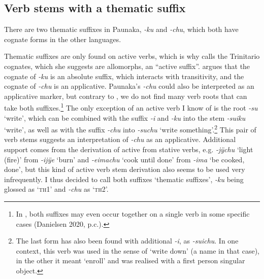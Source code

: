 
%

\subsection{Verb stems with a thematic suffix}\label{sec:ActiveVerbs_TH}

There are two thematic suffixes in Paunaka, \textit{-ku} and \textit{-chu}, which both have cognate forms in the other  languages. 

Thematic suffixes are only found on active verbs, which is why \citet[380]{Rose2014b} calls the Trinitario cognates, which she suggests are allomorphs, an “active suffix”. \citet[240--244]{Danielsen2007} argues that the  cognate of \textit{-ku} is an absolute suffix, which interacts with transitivity, and the cognate of \textit{-chu} is an applicative. Paunaka’s \textit{-chu} could also be interpreted as an applicative  marker, but contrary to , we do not find many verb roots that can take both suffixes.\footnote{In , both suffixes may even occur together on a single verb in some specific cases (Danielsen 2020, p.c.).} The only exception of an active verb I know of is the root \textit{-su} ‘write’, which can be combined with the  suffix \textit{-i} and \textit{-ku} into the stem \textit{-suiku} ‘write’, as well as with the suffix \textit{-chu} into \textit{-suchu} ‘write something’.\footnote{The last form has also been found with additional \textit{-i}, as \textit{-suichu}. In one context, this verb was used in the sense of ‘write down’ (a name in that case), in the other it meant ‘enroll’ and was realised with a first person singular object.} This pair of verb stems suggests an interpretation of \textit{-chu} as an applicative. Additional support comes from the derivation of active from stative verbs,  e.g. \textit{-jÿchu} ‘light (fire)’ from \textit{-ijÿe} ‘burn’ and \textit{-eimachu} ‘cook until done’ from \textit{-ima} ‘be cooked, done’, but this kind of active verb stem derivation also seems to be used very infrequently. I thus decided to call both suffixes ‘thematic suffixes’, \textit{-ku} being glossed as ‘\textsc{th}1’ and  \textit{-chu} as ‘\textsc{th}2’.

